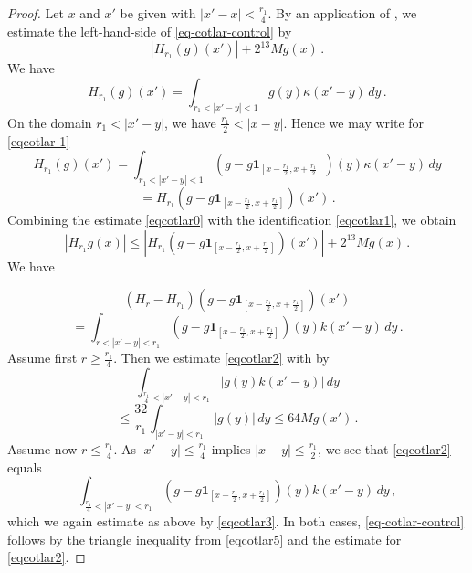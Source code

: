 \begin{proof}
Let $x$ and $x'$ be given with $|x'-x|<\frac {r_1}4$.
By an application of , we estimate
the left-hand-side of
\eqref{eq-cotlar-control} by
\begin{equation}\label{eqcotlar0}
|H_{r_1}(g)(x')|+
2^{13}Mg(x)\,.
\end{equation}
We have
\begin{equation}
\label{eqcotlar-1}
H_{r_1}(g)(x')=
\int_{r_1<|x'-y|<1} g(y) \kappa(x'-y)\, dy\, .
\end{equation}
On the domain $r_1<|x'-y|$, we have $\frac {r_1}2<|x-y|$. Hence we may write
for \eqref{eqcotlar-1}
\begin{equation*}
H_{r_1}(g)(x')=\int_{r_1<|x'-y|<1} (g-g\mathbf{1}_{[x-\frac {r_1} 2,x+\frac {r_1}2]})(y) \kappa(x'-y)\, dy
\end{equation*}
\begin{equation}\label{eqcotlar1}
=H_{r_1}(g-g\mathbf{1}_{[x-\frac {r_1} 2,x+\frac {r_1}2]})(x')\, .
\end{equation}
Combining the estimate \eqref{eqcotlar0} with the identification \eqref{eqcotlar1}, we obtain
\begin{equation}\label{eqcotlar5}
\left|H_{r_1} g(x)
\right|\le
|H_{r_1}(g-g\mathbf{1}_{[x-\frac {r_1} 2,x+\frac {r_1}2]})(x')|+
2^{13}Mg(x)\, .
\end{equation}
We have

\begin{equation*}
(H_{r}-H_{r_1})(g-g\mathbf{1}_{[x-\frac {r_1} 2,x+\frac {r_1}2]})(x')
\end{equation*}
\begin{equation}\label{eqcotlar2}
= \int_{ {r}<|x'-y|<r_1}
(g-g\mathbf{1}_{[x-\frac {r_1} 2,x+\frac {r_1}2]})(y)k(x'-y)\, dy\, .
\end{equation}
Assume first $r\ge \frac {r_1} 4$.
Then we estimate \eqref{eqcotlar2} with
 by
\begin{equation*}
\int_{\frac {r_1}4<|x'-y|<r_1}
|g(y)k(x'-y)|\, dy
\end{equation*}
\begin{equation}\label{eqcotlar3}
\le \frac {32}{r_1}\int_{|x'-y|<r_1}
|g(y)|\, dy \le 64 Mg(x')\, .
\end{equation}
Assume now $r\le \frac {r_1} 4$.
As $|x'-y|\le \frac{r_1}4$ implies
$|x-y|\le \frac {r_1} 2$, we see that
\eqref{eqcotlar2} equals
\begin{equation*}
 \int_{ {\frac {r_1} 4}<|x'-y|<r_1}
(g-g\mathbf{1}_{[x-\frac {r_1} 2,x+\frac {r_1}2]})(y)k(x'-y)\, dy\, ,
\end{equation*}
which we again estimate as above by \eqref{eqcotlar3}.
In both cases, \eqref{eq-cotlar-control} follows by the triangle inequality from \eqref{eqcotlar5} and the estimate for
\eqref{eqcotlar2}.
\end{proof}

